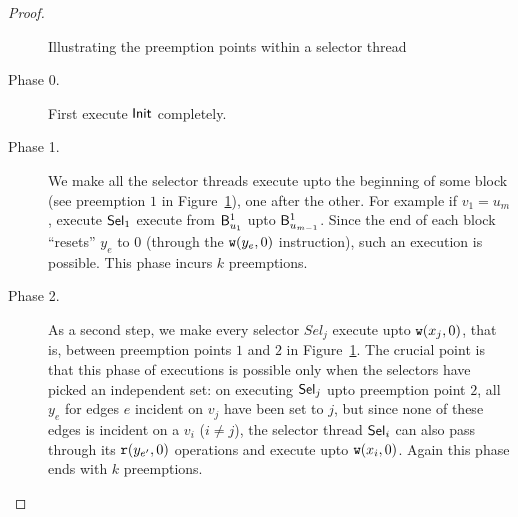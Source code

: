 \begin{proof}
\begin{figure}[h]
{}
\caption{Illustrating the preemption points within a selector thread}
\label{fig:w1-illustration}
\end{figure}



\begin{description}
\item[Phase 0.] First execute $\mathsf{Init}$ completely.
\item[Phase 1.] We make all the selector threads execute upto the beginning of some block (see preemption $1$ in Figure~\ref{fig:w1-illustration}), one after the other. For example if $v_1=u_m$, execute $\mathsf{Sel}_1$ execute from $\mathsf{B}^1_{u_1}$ upto $\mathsf{B}^1_{u_{m-1}}$. Since the end of each block ``resets'' $y_e$ to $0$ (through the $\mathtt{w}(y_e, 0)$ instruction), such an execution is possible. This phase incurs $k$ preemptions. 

\item[Phase 2.] As a second step, we make every selector $Sel_j$  execute upto $\mathtt{w}(x_j, 0)$, that is, between preemption points $1$ and $2$ in Figure~\ref{fig:w1-illustration}. The crucial point is that this phase of executions is possible only when the selectors have picked an independent set: on executing $\mathsf{Sel}_j$ upto preemption point $2$, all $y_e$ for edges $e$ incident on $v_j$ have been set to $j$, but since none of these edges is incident on a $v_i$ ($i \neq j$), the selector thread $\mathsf{Sel}_i$ can also pass through its $\mathtt{r}(y_{e'}, 0)$ operations and execute upto $\mathtt{w}(x_i, 0)$. Again this phase ends with $k$ preemptions. 


\end{description}
\end{proof}
